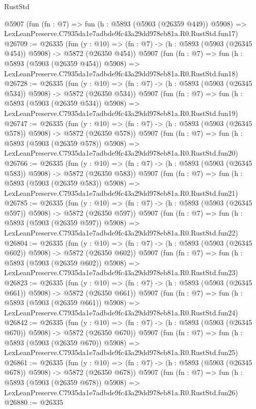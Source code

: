 \begin{lexlean}{RustStd}
\begin{coremodule}
    @5907
    (fun (fn : @7) =>
    fun (h : @5893 (@5903 (@26359 @449)) @5908) =>
    LexLeanPreserve.C7935da1e7adbde9fc43a29dd978eb81a.R0.RustStd.fun17)
@26709 := @26335
    (fun (y : @10) => (fn : @7) -> (h : @5893 (@5903 (@26345 @454)) @5908) -> @5872 (@26350 @454))
    @5907
    (fun (fn : @7) =>
    fun (h : @5893 (@5903 (@26359 @454)) @5908) =>
    LexLeanPreserve.C7935da1e7adbde9fc43a29dd978eb81a.R0.RustStd.fun18)
@26728 := @26335
    (fun (y : @10) => (fn : @7) -> (h : @5893 (@5903 (@26345 @534)) @5908) -> @5872 (@26350 @534))
    @5907
    (fun (fn : @7) =>
    fun (h : @5893 (@5903 (@26359 @534)) @5908) =>
    LexLeanPreserve.C7935da1e7adbde9fc43a29dd978eb81a.R0.RustStd.fun19)
@26747 := @26335
    (fun (y : @10) => (fn : @7) -> (h : @5893 (@5903 (@26345 @578)) @5908) -> @5872 (@26350 @578))
    @5907
    (fun (fn : @7) =>
    fun (h : @5893 (@5903 (@26359 @578)) @5908) =>
    LexLeanPreserve.C7935da1e7adbde9fc43a29dd978eb81a.R0.RustStd.fun20)
@26766 := @26335
    (fun (y : @10) => (fn : @7) -> (h : @5893 (@5903 (@26345 @583)) @5908) -> @5872 (@26350 @583))
    @5907
    (fun (fn : @7) =>
    fun (h : @5893 (@5903 (@26359 @583)) @5908) =>
    LexLeanPreserve.C7935da1e7adbde9fc43a29dd978eb81a.R0.RustStd.fun21)
@26785 := @26335
    (fun (y : @10) => (fn : @7) -> (h : @5893 (@5903 (@26345 @597)) @5908) -> @5872 (@26350 @597))
    @5907
    (fun (fn : @7) =>
    fun (h : @5893 (@5903 (@26359 @597)) @5908) =>
    LexLeanPreserve.C7935da1e7adbde9fc43a29dd978eb81a.R0.RustStd.fun22)
@26804 := @26335
    (fun (y : @10) => (fn : @7) -> (h : @5893 (@5903 (@26345 @602)) @5908) -> @5872 (@26350 @602))
    @5907
    (fun (fn : @7) =>
    fun (h : @5893 (@5903 (@26359 @602)) @5908) =>
    LexLeanPreserve.C7935da1e7adbde9fc43a29dd978eb81a.R0.RustStd.fun23)
@26823 := @26335
    (fun (y : @10) => (fn : @7) -> (h : @5893 (@5903 (@26345 @661)) @5908) -> @5872 (@26350 @661))
    @5907
    (fun (fn : @7) =>
    fun (h : @5893 (@5903 (@26359 @661)) @5908) =>
    LexLeanPreserve.C7935da1e7adbde9fc43a29dd978eb81a.R0.RustStd.fun24)
@26842 := @26335
    (fun (y : @10) => (fn : @7) -> (h : @5893 (@5903 (@26345 @670)) @5908) -> @5872 (@26350 @670))
    @5907
    (fun (fn : @7) =>
    fun (h : @5893 (@5903 (@26359 @670)) @5908) =>
    LexLeanPreserve.C7935da1e7adbde9fc43a29dd978eb81a.R0.RustStd.fun25)
@26861 := @26335
    (fun (y : @10) => (fn : @7) -> (h : @5893 (@5903 (@26345 @678)) @5908) -> @5872 (@26350 @678))
    @5907
    (fun (fn : @7) =>
    fun (h : @5893 (@5903 (@26359 @678)) @5908) =>
    LexLeanPreserve.C7935da1e7adbde9fc43a29dd978eb81a.R0.RustStd.fun26)
@26880 := @26335

\end{coremodule}
\end{lexlean}
